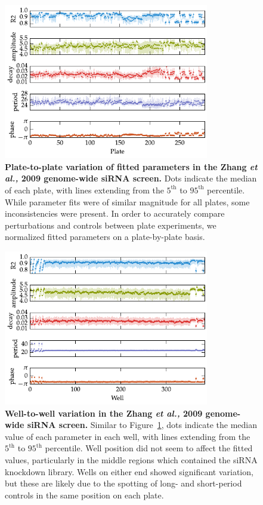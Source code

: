 \documentclass[11pt, letterpaper]{article}
\begin{document}
\begin{figure}[tbp]
  \begin{center}
    \includegraphics[width=0.8\textwidth]{figures/pdfs/zhang_plates.pdf}
  \end{center}
  \caption{{\bfseries Plate-to-plate variation of fitted parameters in the Zhang {\itshape et al.,} 2009 genome-wide siRNA screen.} Dots indicate the median of each plate, with lines extending from the $5^\text{th}$ to $95^\text{th}$ percentile. While parameter fits were of similar magnitude for all plates, some inconsistencies were present. In order to accurately compare perturbations and controls between plate experiments, we normalized fitted parameters on a plate-by-plate basis.}
\label{fig:plate_variation}
\end{figure}

\begin{figure}[tbp]
  \begin{center}
    \includegraphics[width=0.8\textwidth]{figures/pdfs/zhang_wells.pdf}
  \end{center}
  \caption{{\bfseries Well-to-well variation in the Zhang {\itshape et al.,} 2009 genome-wide siRNA screen.} Similar to Figure~\ref{fig:plate_variation}, dots indicate the median value of each parameter in each well, with lines extending from the $5^\text{th}$ to $95^\text{th}$ percentile. Well position did not seem to affect the fitted values, particularly in the middle regions which contained the siRNA knockdown library. Wells on either end showed significant variation, but these are likely due to the spotting of long- and short-period controls in the same position on each plate.}
\label{fig:well_variation}
\end{figure}
\end{document}
